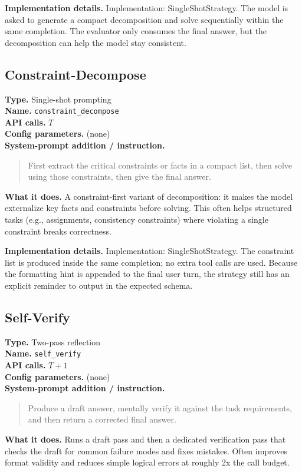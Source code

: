\documentclass[10pt,twocolumn]{article}
\begin{document}
\noindent\textbf{Implementation details.} Implementation: SingleShotStrategy. The model is asked to generate a compact decomposition and solve sequentially within the same completion. The evaluator only consumes the final answer, but the decomposition can help the model stay consistent.

\subsection*{Constraint-Decompose}
\noindent\textbf{Type.} Single-shot prompting\\
\textbf{Name.} \texttt{constraint\_\hspace{0pt}decompose}\\
\textbf{API calls.} $T$\\
\textbf{Config parameters.} (none)\\

\noindent\textbf{System-prompt addition / instruction.}
\begin{quote}\footnotesize
First extract the critical constraints or facts in a compact list, then solve using those constraints, then give the final answer.
\end{quote}
\noindent\textbf{What it does.} A constraint-first variant of decomposition: it makes the model externalize key facts and constraints before solving. This often helps structured tasks (e.g., assignments, consistency constraints) where violating a single constraint breaks correctness.

\noindent\textbf{Implementation details.} Implementation: SingleShotStrategy. The constraint list is produced inside the same completion; no extra tool calls are used. Because the formatting hint is appended to the final user turn, the strategy still has an explicit reminder to output in the expected schema.

\subsection*{Self-Verify}
\noindent\textbf{Type.} Two-pass reflection\\
\textbf{Name.} \texttt{self\_\hspace{0pt}verify}\\
\textbf{API calls.} $T + 1$\\
\textbf{Config parameters.} (none)\\

\noindent\textbf{System-prompt addition / instruction.}
\begin{quote}\footnotesize
Produce a draft answer, mentally verify it against the task requirements, and then return a corrected final answer.
\end{quote}
\noindent\textbf{What it does.} Runs a draft pass and then a dedicated verification pass that checks the draft for common failure modes and fixes mistakes. Often improves format validity and reduces simple logical errors at roughly 2x the call budget.
\end{document}
